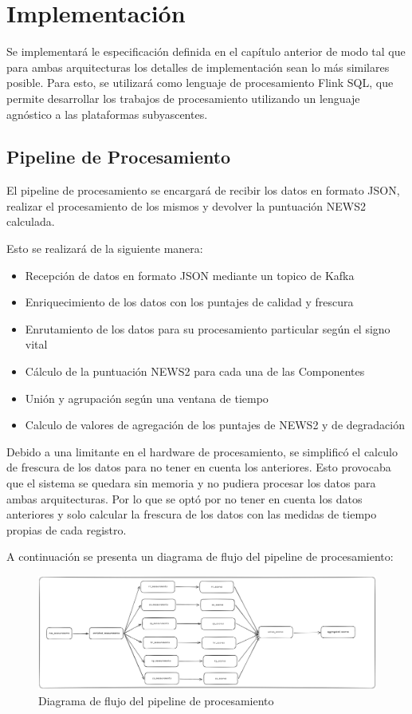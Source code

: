 \section{Implementación}

Se implementará le especificación definida en el capítulo anterior de modo tal que para ambas arquitecturas los detalles de implementación sean lo más similares posible.
Para esto, se utilizará como lenguaje de procesamiento Flink SQL, que permite desarrollar los trabajos de procesamiento utilizando un lenguaje agnóstico a las plataformas subyascentes. 

\subsection{Pipeline de Procesamiento}
El pipeline de procesamiento se encargará de recibir los datos en formato JSON,
realizar el procesamiento de los mismos y devolver la puntuación NEWS2 calculada.

Esto se realizará de la siguiente manera:
\begin{itemize}
    \item Recepción de datos en formato JSON mediante un topico de Kafka
    \item Enriquecimiento de los datos con los puntajes de calidad y frescura
    \item Enrutamiento de los datos para su procesamiento particular según el signo vital
    \item Cálculo de la puntuación NEWS2 para cada una de las Componentes
    \item Unión y agrupación según una ventana de tiempo
    \item Calculo de valores de agregación de los puntajes de NEWS2 y de degradación
\end{itemize}

Debido a una limitante en el hardware de procesamiento, se simplificó el calculo de frescura de los datos para no tener en cuenta los anteriores. 
Esto provocaba que el sistema se quedara sin memoria y no pudiera procesar los datos para ambas arquitecturas. 
Por lo que se optó por no tener en cuenta los datos anteriores y solo calcular la frescura de los datos con las medidas de tiempo propias de cada registro.

A continuación se presenta un diagrama de flujo del pipeline de procesamiento:
\begin{figure}[h]
    \centering
    \includegraphics[width=1\textwidth]{desarrollo/pipeline.png}
    \caption{Diagrama de flujo del pipeline de procesamiento}
    \label{fig:flowchart}
\end{figure}

